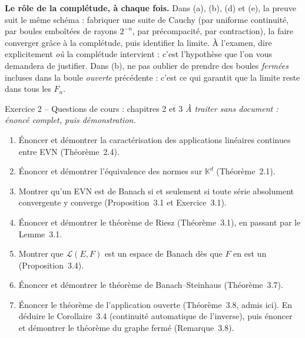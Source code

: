 \documentclass[11pt,a4paper]{article}
\newcommand{\K}{\mathbb{K}}
\newcommand{\Lc}{\mathcal{L}}
\theoremstyle{definition}
\begin{document}
\begin{methode}
\textbf{Le rôle de la complétude, à chaque fois.} Dans (a), (b), (d) et (e), la preuve suit le même schéma : fabriquer une suite de Cauchy (par uniforme continuité, par boules emboîtées de rayons $2^{-n}$, par précompacité, par contraction), la faire converger grâce à la complétude, puis identifier la limite. À l'examen, dire explicitement \emph{où} la complétude intervient : c'est l'hypothèse que l'on vous demandera de justifier. Dans (b), ne pas oublier de prendre des boules \emph{fermées} incluses dans la boule \emph{ouverte} précédente : c'est ce qui garantit que la limite reste dans tous les $F_n$.
\end{methode}

\begin{exo}{Exercice 2 -- Questions de cours : chapitres 2 et 3}
\emph{À traiter sans document : énoncé complet, puis démonstration.}
\begin{enumerate}[label=(\alph*)]
  \item Énoncer et démontrer la caractérisation des applications linéaires continues entre EVN (Théorème~2.4).
  \item Énoncer et démontrer l'équivalence des normes sur $\K^d$ (Théorème~2.1).
  \item Montrer qu'un EVN est de Banach si et seulement si toute série absolument convergente y converge (Proposition~3.1 et Exercice~3.1).
  \item Énoncer et démontrer le théorème de Riesz (Théorème~3.1), en passant par le Lemme~3.1.
  \item Montrer que $\Lc(E,F)$ est un espace de Banach dès que $F$ en est un (Proposition~3.4).
  \item Énoncer et démontrer le théorème de Banach--Steinhaus (Théorème~3.7).
  \item Énoncer le théorème de l'application ouverte (Théorème~3.8, admis ici). En déduire le Corollaire~3.4 (continuité automatique de l'inverse), puis énoncer et démontrer le théorème du graphe fermé (Remarque~3.8).
\end{enumerate}
\end{exo}
\end{document}
